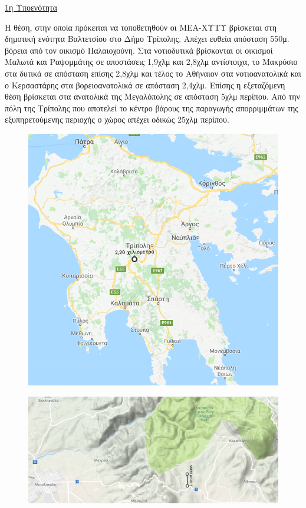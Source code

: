 \documentclass[12pt]{article}
\begin{document}
	\underline{1η Υποενότητα}
	
	Η θέση, στην οποία πρόκειται να τοποθετηθούν οι ΜΕΑ-ΧΥΤΥ βρίσκεται στη δημοτική ενότητα Βαλτετσίου στο Δήμο Τρίπολης. Απέχει ευθεία απόσταση 550μ. βόρεια από τον οικισμό Παλαιοχούνη. Στα νοτιοδυτικά βρίσκονται οι οικισμοί Μαλωτά και Ραψομμάτης σε αποστάσεις 1,9χλμ και 2,8χλμ αντίστοιχα, το Μακρύσιο στα δυτικά σε απόσταση επίσης 2,8χλμ και τέλος το Αθήναιον στα νοτιοανατολικά και ο Κερσαστάρης στα βορειοανατολικά σε απόσταση 2,4χλμ. Επίσης η εξεταζόμενη θέση βρίσκεται στα ανατολικά της Μεγαλόπολης σε απόσταση 5χλμ περίπου. Από την πόλη της Τρίπολης που αποτελεί το κέντρο βάρους της παραγωγής απορριμμάτων της εξυπηρετούμενης περιοχής ο χώρος απέχει οδικώς 25χλμ περίπου.
	
	\begin{figure} [H]
		\begin{center}
			\includegraphics [scale = 0.60] {map7.png}
		\end{center}
	\end{figure}

	\begin{figure} [H]
		\begin{center}
			\includegraphics [scale = 0.40] {map8.png}
		\end{center}
	\end{figure}
	
\end{document}
